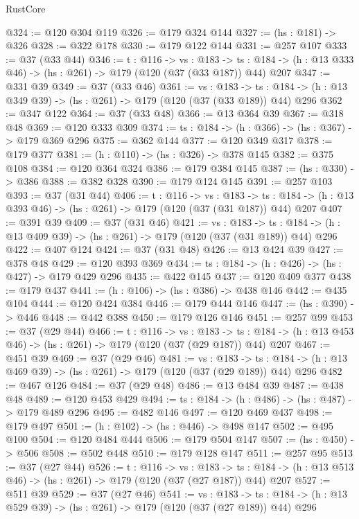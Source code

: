 \begin{lexlean}{RustCore}
\begin{coremodule}
@324 := @120 @304 @119
@326 := @179 @324 @144
@327 := (hs : @181) -> @326
@328 := @322 @178
@330 := @179 @122 @144
@331 := @257 @107
@333 := @37 (@33 @44)
@346 := {t : @116} ->
  {vs : @183} ->
  {ts : @184} -> (h : @13 @333 @46) -> (hs : @261) -> @179 (@120 (@37 (@33 @187)) @44) @207
@347 := @331 @39
@349 := @37 (@33 @46)
@361 := {vs : @183} ->
  {ts : @184} -> (h : @13 @349 @39) -> (hs : @261) -> @179 (@120 (@37 (@33 @189)) @44) @296
@362 := @347 @122
@364 := @37 (@33 @48)
@366 := @13 @364 @39
@367 := @318 @48
@369 := @120 @333 @309
@374 := {ts : @184} -> (h : @366) -> (hs : @367) -> @179 @369 @296
@375 := @362 @144
@377 := @120 @349 @317
@378 := @179 @377
@381 := (h : @110) -> (hs : @326) -> @378 @145
@382 := @375 @108
@384 := @120 @364 @324
@386 := @179 @384 @145
@387 := (hs : @330) -> @386
@388 := @382 @328
@390 := @179 @124 @145
@391 := @257 @103
@393 := @37 (@31 @44)
@406 := {t : @116} ->
  {vs : @183} ->
  {ts : @184} -> (h : @13 @393 @46) -> (hs : @261) -> @179 (@120 (@37 (@31 @187)) @44) @207
@407 := @391 @39
@409 := @37 (@31 @46)
@421 := {vs : @183} ->
  {ts : @184} -> (h : @13 @409 @39) -> (hs : @261) -> @179 (@120 (@37 (@31 @189)) @44) @296
@422 := @407 @124
@424 := @37 (@31 @48)
@426 := @13 @424 @39
@427 := @378 @48
@429 := @120 @393 @369
@434 := {ts : @184} -> (h : @426) -> (hs : @427) -> @179 @429 @296
@435 := @422 @145
@437 := @120 @409 @377
@438 := @179 @437
@441 := (h : @106) -> (hs : @386) -> @438 @146
@442 := @435 @104
@444 := @120 @424 @384
@446 := @179 @444 @146
@447 := (hs : @390) -> @446
@448 := @442 @388
@450 := @179 @126 @146
@451 := @257 @99
@453 := @37 (@29 @44)
@466 := {t : @116} ->
  {vs : @183} ->
  {ts : @184} -> (h : @13 @453 @46) -> (hs : @261) -> @179 (@120 (@37 (@29 @187)) @44) @207
@467 := @451 @39
@469 := @37 (@29 @46)
@481 := {vs : @183} ->
  {ts : @184} -> (h : @13 @469 @39) -> (hs : @261) -> @179 (@120 (@37 (@29 @189)) @44) @296
@482 := @467 @126
@484 := @37 (@29 @48)
@486 := @13 @484 @39
@487 := @438 @48
@489 := @120 @453 @429
@494 := {ts : @184} -> (h : @486) -> (hs : @487) -> @179 @489 @296
@495 := @482 @146
@497 := @120 @469 @437
@498 := @179 @497
@501 := (h : @102) -> (hs : @446) -> @498 @147
@502 := @495 @100
@504 := @120 @484 @444
@506 := @179 @504 @147
@507 := (hs : @450) -> @506
@508 := @502 @448
@510 := @179 @128 @147
@511 := @257 @95
@513 := @37 (@27 @44)
@526 := {t : @116} ->
  {vs : @183} ->
  {ts : @184} -> (h : @13 @513 @46) -> (hs : @261) -> @179 (@120 (@37 (@27 @187)) @44) @207
@527 := @511 @39
@529 := @37 (@27 @46)
@541 := {vs : @183} ->
  {ts : @184} -> (h : @13 @529 @39) -> (hs : @261) -> @179 (@120 (@37 (@27 @189)) @44) @296

\end{coremodule}
\end{lexlean}

